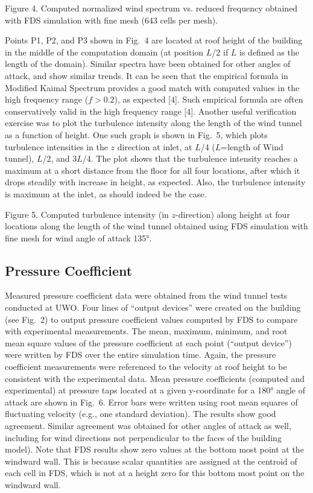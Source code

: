 Figure 4. Computed normalized wind spectrum vs. reduced frequency obtained with FDS simulation with fine mesh (643 cells per mesh).

Points P1, P2, and P3 shown in Fig.~4 are located at roof height of the building in the middle of the computation domain (at position $L$/2 if $L$ is defined as the length of the domain). Similar spectra have been obtained for other angles of attack, and show similar trends. It can be seen that the empirical formula in Modified Kaimal Spectrum provides a good match with computed values in the high frequency range ($f>0.2$), as expected [4]. Such empirical formula are often conservatively valid in the high frequency range [4]. Another useful verification exercise was to plot the turbulence intensity along the length of the wind tunnel as a function of height. One such graph is shown in Fig.~5, which plots turbulence intensities in the $z$ direction at inlet, at $L$/4 ($L$=length of Wind tunnel), $L$/2, and 3$L$/4. The plot shows that the turbulence intensity reaches a maximum at a short distance from the floor for all four locations, after which it drops steadily with increase in height, as expected. Also, the turbulence intensity is maximum at the inlet, as should indeed be the case. 

 
Figure 5. Computed turbulence intensity (in $z$-direction) along height at four locations along the length of the wind tunnel obtained using FDS simulation with fine mesh for wind angle of attack 135\si{\degree}.

\subsection{Pressure Coefficient}

Measured pressure coefficient data were obtained from the wind tunnel tests conducted at UWO. Four lines of ``output devices'' were created on the building (see Fig.~2) to output pressure coefficient values computed by FDS to compare with experimental measurements. The mean, maximum, minimum, and root mean square values of the pressure coefficient at each point (``output device'') were written by FDS over the entire simulation time. Again, the pressure coefficient measurements were referenced to the velocity at roof height to be consistent with the experimental data. Mean pressure coefficients (computed and experimental) at pressure taps located at a given y-coordinate for a 180\si{\degree} angle of attack are shown in Fig.~6. Error bars were written using root mean squares of fluctuating velocity (e.g., one standard deviation). The results show good agreement. Similar agreement was obtained for other angles of attack as well, including for wind directions not perpendicular to the faces of the building model). Note that FDS results show zero values at the bottom most point at the windward wall. This is because scalar quantities are assigned at the centroid of each cell in FDS, which is not at a height zero for this bottom most point on the windward wall.


